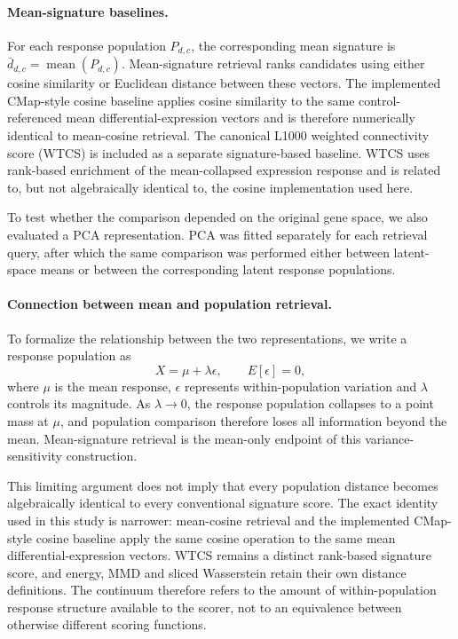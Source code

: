 \documentclass[11pt,letterpaper]{article}
\begin{document}
\paragraph{Mean-signature baselines.}
For each response population $P_{d,c}$, the corresponding mean signature is
$\bar d_{d,c}=\operatorname{mean}(P_{d,c})$. Mean-signature retrieval ranks candidates
using either cosine similarity or Euclidean distance between these vectors. The
implemented CMap-style cosine baseline applies cosine similarity to the same
control-referenced mean differential-expression vectors and is therefore numerically
identical to mean-cosine retrieval. The canonical L1000 weighted connectivity score
(WTCS) is included as a separate signature-based baseline. WTCS uses rank-based
enrichment of the mean-collapsed expression response and is related to, but not
algebraically identical to, the cosine implementation used here.

To test whether the comparison depended on the original gene space, we also evaluated
a PCA representation. PCA was fitted separately for each retrieval query, after which
the same comparison was performed either between latent-space means or between the
corresponding latent response populations.

\paragraph{Connection between mean and population retrieval.}
To formalize the relationship between the two representations, we write a response
population as
$$
X=\mu+\lambda\epsilon,
\qquad
E[\epsilon]=0,
$$
where $\mu$ is the mean response, $\epsilon$ represents within-population variation and
$\lambda$ controls its magnitude. As $\lambda\rightarrow0$, the response population
collapses to a point mass at $\mu$, and population comparison therefore loses all
information beyond the mean. Mean-signature retrieval is the mean-only endpoint of
this variance-sensitivity construction.

This limiting argument does not imply that every population distance becomes
algebraically identical to every conventional signature score. The exact identity used
in this study is narrower: mean-cosine retrieval and the implemented CMap-style cosine
baseline apply the same cosine operation to the same mean differential-expression
vectors. WTCS remains a distinct rank-based signature score, and energy, MMD and
sliced Wasserstein retain their own distance definitions. The continuum therefore
refers to the amount of within-population response structure available to the scorer,
not to an equivalence between otherwise different scoring functions.
\end{document}
